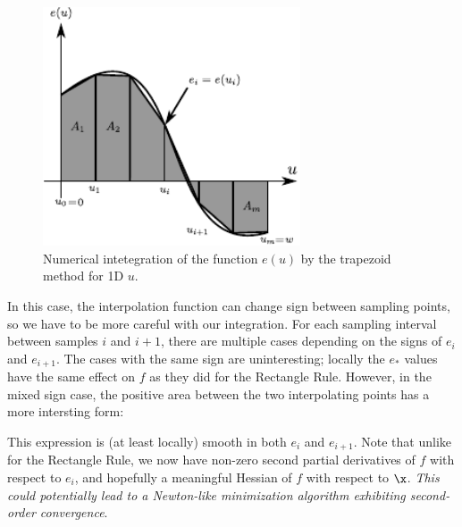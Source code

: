 \begin{figure}[htb]
 \centering
 \includegraphics[width=3in]{figures_subgradient/integration_trapezoid.pdf}
 \caption{Numerical intetegration of the function $e(u)$ by the trapezoid method for 1D $u$.}
 \label{fig:trapezoid}
\end{figure}


In this case, the interpolation function can change sign between sampling
points, so we have to be more careful with our integration.  For each sampling
interval between samples $i$ and $i+1$, there are multiple cases depending on
the signs of $e_i$ and $e_{i+1}$.  The cases with the same sign are
uninteresting; locally the $e_*$ values have the same effect on $f$ as they did
for the Rectangle Rule.  However, in the mixed sign case, the positive area
between the two interpolating points has a more intersting form:



This expression is (at least locally) smooth in both $e_i$ and $e_{i+1}$.  Note
that unlike for the Rectangle Rule, we now have non-zero second partial
derivatives of $f$ with respect to $e_i$, and hopefully a meaningful Hessian of
$f$ with respect to $\x$.  {\em This could potentially lead to a Newton-like
minimization algorithm exhibiting second-order convergence}.  



